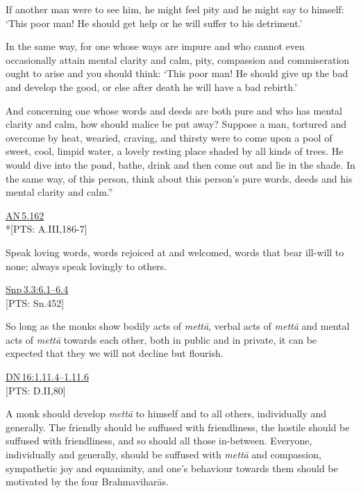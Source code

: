 \documentclass[10pt, openright]{book}
\begin{document}
If another man were to see him, he might feel pity and he might say to himself: ‘This poor man! He should get help or he will suffer to his detriment.’


In the same way, for one whose ways are impure and who cannot even occasionally attain mental clarity and calm, pity, compassion and commiseration ought to arise and you should think: ‘This poor man! He should give up the bad and develop the good, or else after death he will have a bad rebirth.’


And concerning one whose words and deeds are both pure and who has mental clarity and calm, how should malice be put away? Suppose a man, tortured and overcome by heat, wearied, craving, and thirsty were to come upon a pool of sweet, cool, limpid water, a lovely resting place shaded by all kinds of trees. He would dive into the pond, bathe, drink and then come out and lie in the shade. In the same way, of this person, think about this person’s pure words, deeds and his mental clarity and calm.”


\begin{flushright}
\href{https://suttacentral.net/an5.162/en/sujato}{AN 5.162}\\

*[PTS: A.III,186-7]


\end{flushright}
Speak loving words, words rejoiced at and welcomed, words that bear ill-will to none; always speak lovingly to others.


\begin{flushright}
\href{https://suttacentral.net/snp3.3/en/sujato\#6.1}{Snp 3.3:6.1–6.4}\\

[PTS: Sn.452]


\end{flushright}
So long as the monks show bodily acts of \textit{mettā}, verbal acts of \textit{mettā} and mental acts of \textit{mettā} towards each other, both in public and in private, it can be expected that they we will not decline but flourish.


\begin{flushright}
\href{https://suttacentral.net/dn16/en/sujato\#1.11.4}{DN 16:1.11.4–1.11.6}\\

[PTS: D.II,80]


\end{flushright}
A monk should develop \textit{mettā} to himself and to all others, individually and generally. The friendly should be suffused with friendliness, the hostile should be suffused with friendliness, and so should all those in-between. Everyone, individually and generally, should be suffused with \textit{mettā} and compassion, sympathetic joy and equanimity, and one’s behaviour towards them should be motivated by the four Brahmaviharās.
\end{document}

